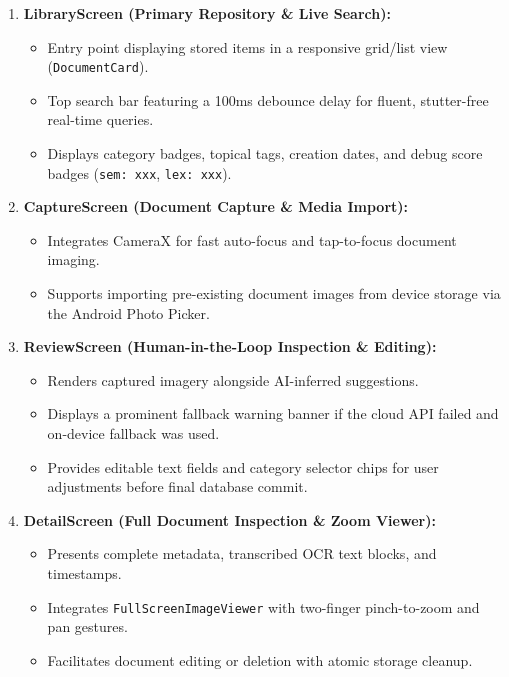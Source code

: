 \begin{enumerate}
    \item \textbf{LibraryScreen (Primary Repository \& Live Search):}
    \begin{itemize}
        \item Entry point displaying stored items in a responsive grid/list view (\texttt{DocumentCard}).
        \item Top search bar featuring a 100ms debounce delay for fluent, stutter-free real-time queries.
        \item Displays category badges, topical tags, creation dates, and debug score badges (\texttt{sem: xxx}, \texttt{lex: xxx}).
    \end{itemize}

    \item \textbf{CaptureScreen (Document Capture \& Media Import):}
    \begin{itemize}
        \item Integrates CameraX for fast auto-focus and tap-to-focus document imaging.
        \item Supports importing pre-existing document images from device storage via the Android Photo Picker.
    \end{itemize}

    \item \textbf{ReviewScreen (Human-in-the-Loop Inspection \& Editing):}
    \begin{itemize}
        \item Renders captured imagery alongside AI-inferred suggestions.
        \item Displays a prominent fallback warning banner if the cloud API failed and on-device fallback was used.
        \item Provides editable text fields and category selector chips for user adjustments before final database commit.
    \end{itemize}

    \item \textbf{DetailScreen (Full Document Inspection \& Zoom Viewer):}
    \begin{itemize}
        \item Presents complete metadata, transcribed OCR text blocks, and timestamps.
        \item Integrates \texttt{FullScreenImageViewer} with two-finger pinch-to-zoom and pan gestures.
        \item Facilitates document editing or deletion with atomic storage cleanup.
    \end{itemize}


\end{enumerate}
